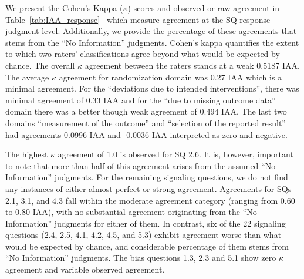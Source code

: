 \documentclass[sn-mathphys,Numbered]{sn-jnl}%
\theoremstyle{thmstyleone}%
\theoremstyle{thmstyletwo}%
\theoremstyle{thmstylethree}%
\begin{document}
%
%
%

We present the Cohen's Kappa ($\kappa$) scores and observed or raw agreement in Table~\ref{tab:IAA_response}~\cite{mchugh2012interrater} which measure agreement at the SQ response judgment level.
Additionally, we provide the percentage of these agreements that stems from the ``No Information'' judgments.
Cohen's kappa quantifies the extent to which two raters' classifications agree beyond what would be expected by chance.
The overall $\kappa$ agreement between the raters stands at a weak 0.5187 IAA.
The average $\kappa$ agreement for randomization domain was 0.27 IAA which is a minimal agreement.
For the ``deviations due to intended interventions'', there was minimal agreement of 0.33 IAA and for the ``due to missing outcome data'' domain there was a better though weak agreement of 0.494 IAA.
The last two domains ``measurement of the outcome'' and ``selection of the reported result'' had agreements 0.0996 IAA and -0.0036 IAA interpreted as zero and negative.



The highest $\kappa$ agreement of 1.0 is observed for SQ 2.6.
It is, however, important to note that more than half of this agreement arises from the assumed ``No Information'' judgments.
For the remaining signaling questions, we do not find any instances of either almost perfect or strong agreement.
Agreements for SQs 2.1, 3.1, and 4.3 fall within the moderate agreement category (ranging from 0.60 to 0.80 IAA), with no substantial agreement originating from the ``No Information'' judgments for either of them.
In contrast, six of the 22 signaling questions (2.4, 2.5, 4.1, 4.2, 4.5, and 5.3) exhibit agreement worse than what would be expected by chance, and considerable percentage of them stems from ``No Information'' judgments.
The bias questions 1.3, 2.3 and 5.1 show zero $\kappa$ agreement and variable observed agreement.
\end{document}
